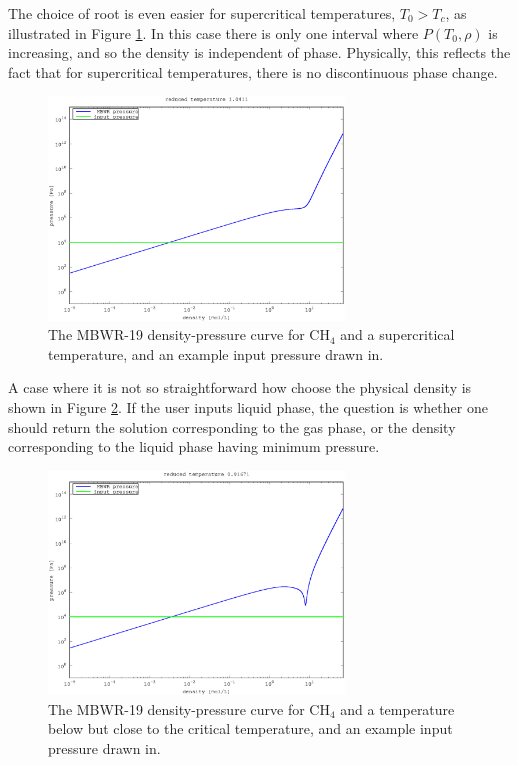 \documentclass[english]{../thermomemo/thermomemo}
\numberwithin{equation}{section}
\begin{document}
The choice of root is even easier for supercritical temperatures, $T_0
> T_c$, as illustrated in Figure \ref{fig:p_ill_sup}. In this
case there is only one interval where $P(T_0,\rho)$ is increasing, and
so the density is independent of phase. Physically, this reflects the
fact that for supercritical temperatures, there is no discontinuous
phase change.

\begin{figure}[h]
  \centering
  \includegraphics[width=0.7\textwidth]{figures/pressureIllustrationSupercritical.eps}
  \caption{The MBWR-19 density-pressure curve for CH$_4$ and a supercritical temperature, and
    an example input pressure drawn in.}
  \label{fig:p_ill_sup}
\end{figure}

A case where it is not so straightforward how choose the physical
density is shown in Figure \ref{fig:p_ill_meta}. If the user inputs liquid
phase, the question is whether one should return the solution
corresponding to the gas phase, or the density corresponding to the
liquid phase having minimum pressure.

\begin{figure}[h]
  \centering
  \includegraphics[width=0.7\textwidth]{figures/pressureIllustrationMeta.eps}
  \caption{The MBWR-19 density-pressure curve for CH$_4$ and a
    temperature below but close to the critical temperature, and an example input pressure drawn in.}
  \label{fig:p_ill_meta}
\end{figure}
\end{document}
